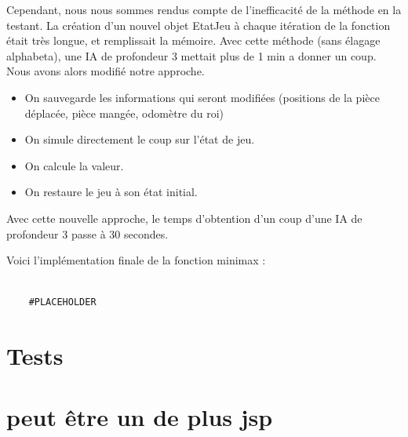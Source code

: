 \documentclass{article}
\begin{document}
Cependant, nous nous sommes rendus compte de l'inefficacité de la méthode en la testant.
La création d'un nouvel objet EtatJeu à chaque itération de la fonction était très longue,
et remplissait la mémoire. Avec cette méthode (sans élagage alphabeta), une IA de profondeur 3
mettait plus de 1 min a donner un coup. \\

Nous avons alors modifié notre approche.
\begin{itemize}
    \item On sauvegarde les informations qui seront modifiées (positions de la pièce déplacée, pièce mangée, odomètre du roi)
    \item On simule directement le coup sur l'état de jeu.
    \item On calcule la valeur.
    \item On restaure le jeu à son état initial.
\end{itemize}
Avec cette nouvelle approche, le temps d'obtention d'un coup d'une IA de profondeur 3 passe à 30 secondes.

Voici l'implémentation finale de la fonction minimax :

\begin{verbatim}

    #PLACEHOLDER
\end{verbatim}

\section{Tests}
\section{peut être un de plus jsp}
\end{document}
